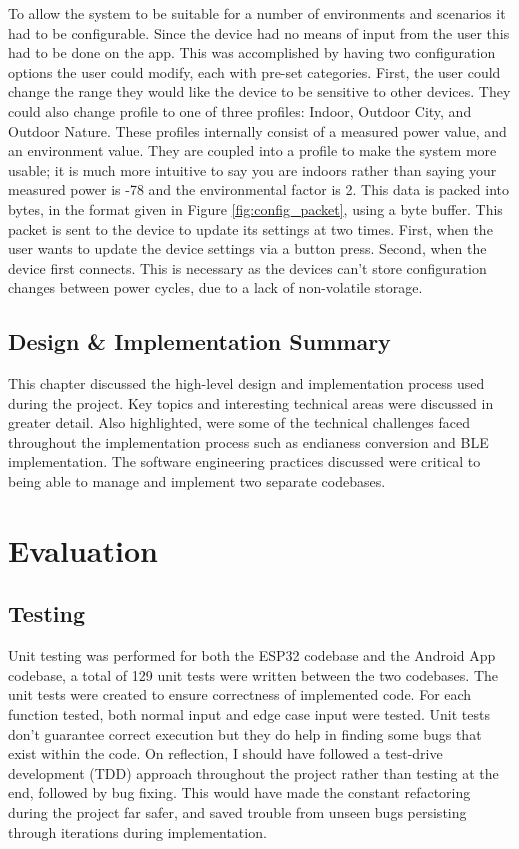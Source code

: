 \documentclass{l4proj}
\begin{document}
To allow the system to be suitable for a number of environments and scenarios it had to be configurable. Since the device had no means of input from the user this had to be done on the app. This was accomplished by having two configuration options the user could modify, each with pre-set categories. First, the user could change the range they would like the device to be sensitive to other devices. They could also change profile to one of three profiles: Indoor, Outdoor City, and Outdoor Nature. These profiles internally consist of a measured power value, and an environment value. They are coupled into a profile to make the system more usable; it is much more intuitive to say you are indoors rather than saying your measured power is -78 and the environmental factor is 2. This data is packed into bytes, in the format given in Figure \ref{fig:config_packet}, using a byte buffer. This packet is sent to the device to update its settings at two times. First, when the user wants to update the device settings via a button press. Second, when the device first connects. This is necessary as the devices can't store configuration changes between power cycles, due to a lack of non-volatile storage.

\section{Design \& Implementation Summary}

This chapter discussed the high-level design and implementation process used during the project. Key topics and interesting technical areas were discussed in greater detail. Also highlighted, were some of the technical challenges faced throughout the implementation process such as endianess conversion and BLE implementation. The software engineering practices discussed were critical to being able to manage and implement two separate codebases.

\chapter{Evaluation}

\section{Testing}

Unit testing was performed for both the ESP32 codebase and the Android App codebase, a total of 129 unit tests were written between the two codebases. The unit tests were created to ensure correctness of implemented code. For each function tested, both normal input and edge case input were tested. Unit tests don't guarantee correct execution but they do help in finding some bugs that exist within the code. On reflection, I should have followed a test-drive development (TDD) approach throughout the project rather than testing at the end, followed by bug fixing. This would have made the constant refactoring during the project far safer, and saved trouble from unseen bugs persisting through iterations during implementation.
\end{document}
